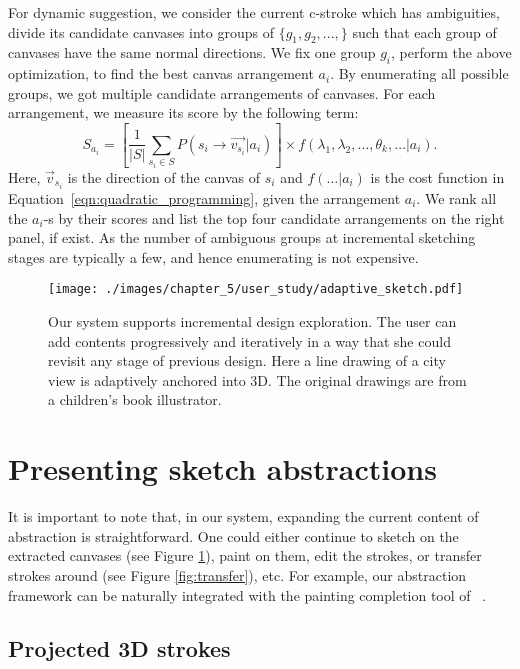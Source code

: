 For dynamic suggestion, we consider the current c-stroke which has ambiguities, divide its candidate canvases into groups of $\{g_1, g_2, ..., \}$ such that each group of canvases have the same normal directions. We fix one group $g_i$, perform the above optimization, to find the best canvas arrangement $a_i$. By enumerating all possible groups, we got multiple candidate arrangements of canvases. For each arrangement, we measure its score by the following term:
\begin{equation}
S_{a_i} = [\frac{1}{|S|}\sum_{s_i \in S}P(s_i \rightarrow \vec{v_{s_i}} | a_i)] \times f(\lambda_1, \lambda_2, \dots, \theta_k, \dots | a_i).
\end{equation}
Here, $\vec{v}_{s_i}$ is the direction of the canvas of $s_i$ and $f(\dots | a_i)$ is the cost function in Equation~\ref{eqn:quadratic_programming}, given the arrangement $a_i$. We rank all the $a_i$-s by their scores and list the top four candidate arrangements on the right panel, if exist. As the number of ambiguous groups at incremental sketching stages are typically a few, and hence enumerating is not expensive.


\begin{figure}[t!]
  \texttt{[image: ./images/chapter\_5/user\_study/adaptive\_sketch.pdf]}
  \caption[Adaptive sketch design.]{Our system supports incremental design exploration. The user can add contents progressively and iteratively in a way that she could revisit any stage of previous design. Here a line drawing of a city view is adaptively anchored into 3{D}. The original drawings are from a children's book illustrator.
  \label{fig:adaptive_sketch}
  }
\end{figure}



\section{Presenting sketch abstractions}

It is important to note that, in our system, expanding the current content of abstraction is straightforward. One could either continue to sketch on the extracted canvases (see Figure \ref{fig:adaptive_sketch}), paint on them, edit the strokes, or transfer strokes around (see Figure \ref{fig:transfer}), etc. For example, our abstraction framework can be naturally integrated with the painting completion tool of ~\cite{Xing:2014}.

\subsection{Projected 3D strokes}

